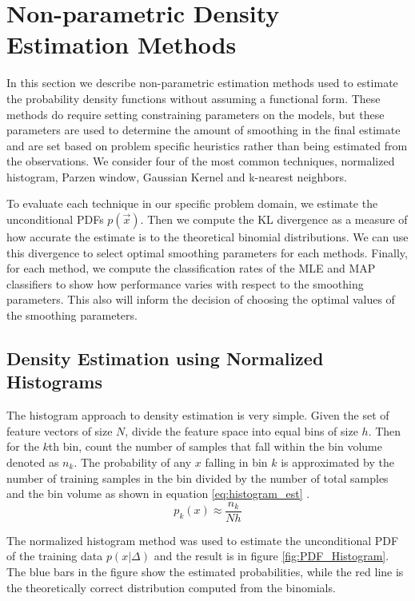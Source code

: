 \documentclass[journal]{IEEEtran}
\begin{document}
\section{Non-parametric Density Estimation Methods}
\par In this section we describe non-parametric estimation methods used to estimate the probability density functions without assuming a functional form. These methods do require setting constraining parameters on the models, but these parameters are used to determine the amount of smoothing in the final estimate and are set based on problem specific heuristics rather than being estimated from the observations. We consider four of the most common techniques, normalized histogram, Parzen window, Gaussian Kernel and k-nearest neighbors.
\par To evaluate each technique in our specific problem domain, we estimate the unconditional PDFs \(p(\vec{x})\). Then we compute the KL divergence as a measure of how accurate the estimate is to the theoretical binomial distributions. We can use this divergence to select optimal smoothing parameters for each methods. Finally, for each method, we compute the classification rates of the MLE and MAP classifiers to show how performance varies with respect to the smoothing parameters. This also will inform the decision of choosing the optimal values of the smoothing parameters.

\subsection{Density Estimation using Normalized Histograms}
\par The histogram approach to density estimation is very simple. Given the set of feature vectors of size \(N\), divide the feature space into equal bins of size \(h\). Then for the \(k\)th bin, count the number of samples that fall within the bin volume denoted as \(n_k\). The probability of any \(x\) falling in bin \(k\) is approximated by the number of training samples in the bin divided by the number of total samples and the bin volume as shown in equation \ref{eq:histogram_est} \cite{densityhandout}.
\begin{equation}
\label{eq:histogram_est}
p_k(x) \approx \frac{n_k}{N h}
\end{equation}

\par The normalized histogram method was used to estimate the unconditional PDF of the training data \(p(x\vert\Delta)\) and the result is in figure \ref{fig:PDF_Histogram}. The blue bars in the figure show the estimated probabilities, while the red line is the theoretically correct distribution computed from the binomials.
\end{document}
